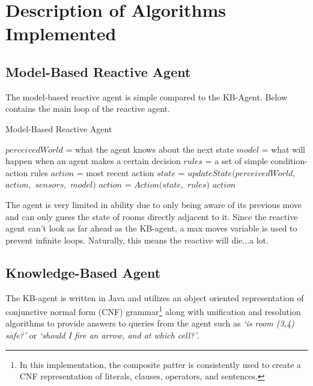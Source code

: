 \section{Description of Algorithms Implemented} \label{sec:description}

\subsection{Model-Based Reactive Agent} \label{subsec:desc-modelbasedreactiveagent}
The model-based reactive agent is simple compared to the KB-Agent. Below contains the main loop of the reactive agent.

\begin{algorithm}[!ht]
\caption{Model-Based Reactive Agent}\label{Model-Based Reactive Agent}
\begin{algorithmic}[1]
	\State $perceivedWorld$ = what the agent knows about the next state
    \State $model$ = what will happen when an agent makes a certain decision
    \State $rules$ = a set of simple condition-action rules
    \State $action$ = most recent action
    \State
    \State $state$ = $updateState(perceivedWorld, $ $action, $ $sensors, $ $model)$
    \State $action$ = $Action(state, $ $rules)$
    \State \Return $action$
\EndProcedure
\EndWhile
\end{algorithmic}
\end{algorithm}

The agent is very limited in ability due to only being aware of its previous move and can only guess the state of rooms directly adjacent to it. Since the reactive agent can't look as far ahead as the KB-agent, a max moves variable is used to prevent infinite loops\cite{Zhang}. Naturally, this means the reactive will die...a lot.

\subsection{Knowledge-Based Agent} \label{subsec:desc-knowledgebasedagent}
The KB-agent is written in Java and utilizes an object oriented representation of conjunctive normal form (CNF) grammar\footnote{In this implementation, the composite patter is consistently used to create a CNF representation of literals, clauses, operators, and sentences.} along with unification and resolution algorithms to provide answers to queries from the agent such as \textit{`is room (3,4) safe?'} or \textit{`should I fire an arrow, and at which cell?'}.


